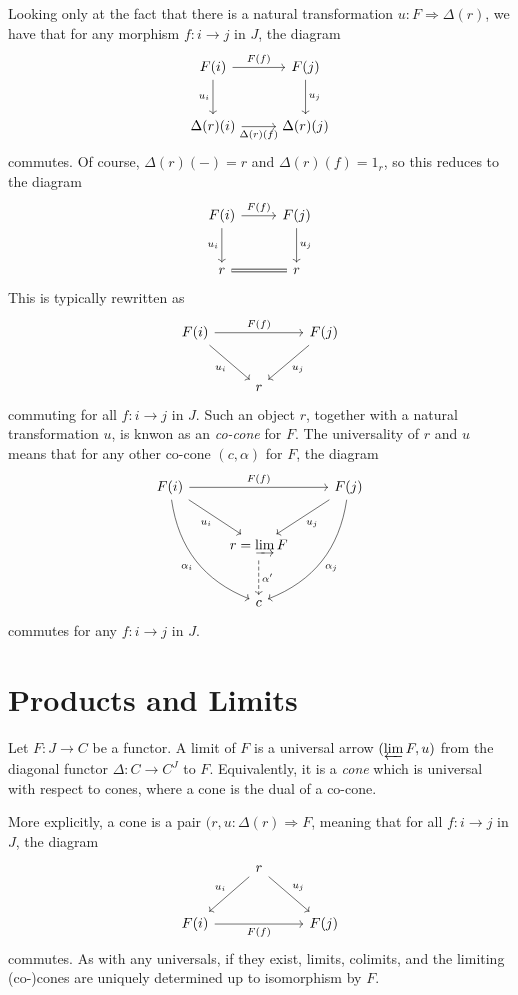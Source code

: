 Looking only at the fact that there is a natural transformation $u : F \Rightarrow \Delta (r)$, we have that for any morphism $f : i \to j$ in $J$, the diagram
\[\begin{tikzcd}[row sep = 2.5em, column sep = 2.5em]
F(i)\ar[" F(f) ", r] \ar[" u_i "', d]  & F(j)\ar[" u_j ", d]  \\
\Delta (r)(i)\ar[" \Delta (r)(f) "', r]  & \Delta (r)(j)
\end{tikzcd}\]
commutes. Of course, $\Delta (r)(-)=r$ and $\Delta (r)(f)=1_r$, so this reduces to the diagram
\[\begin{tikzcd}[row sep = 2.5em, column sep = 2.5em]
F(i)\ar[" F(f) ", r] \ar[" u_i "', d]  & F(j)\ar[" u_j ", d]  \\
r\ar[equals, r]  & r
\end{tikzcd}\]
This is typically rewritten as
\[\begin{tikzcd}[row sep = 2.5em, column sep = 2.5em]
F(i)\ar[" F(f) ", rr] \ar[" u_i "', dr]  &  & F(j)\ar[" u_j ", dl]  \\
 & r & 
\end{tikzcd}\]
commuting for all $f : i \to j$ in $J$. Such an object $r$, together with a natural transformation $u$, is knwon as an \emph{co-cone} for $F$. The universality of $r$ and $u$ means that for any other co-cone $(c,\alpha )$ for $F$, the diagram
\[\begin{tikzcd}[row sep = 2.5em, column sep = 2.5em]
F(i)\ar[" F(f) ", rr] \ar[" u_i "', dr] \ar[" \alpha _i "', bend right, ddr]  &  & F(j)\ar[" u_j ", dl] \ar[" \alpha _j ", bend left, ddl]  \\
 & r=\varinjlim F \ar[" \alpha ' ", dashed, d]  &  \\
 & c & 
\end{tikzcd}\]
commutes for any $f : i \to j$ in $J$.

\section{Products and Limits}

\begin{definition}[Limit]\label{dfn:3.5}
	Let $F : J \to C$ be a functor. A limit of $F$ is a universal arrow $(\varprojlim F,u)$ from the diagonal functor $\Delta : C \to C^J$ to $F$. Equivalently, it is a \emph{cone} which is universal with respect to cones, where a cone is the dual of a co-cone.
\end{definition}
More explicitly, a cone is a pair $(r,u : \Delta (r) \Rightarrow F$, meaning that for all $f : i \to j$ in $J$, the diagram
\[\begin{tikzcd}[row sep = 2.5em, column sep = 2.5em]
 & r\ar[" u_j ", dr] \ar[" u_i "', dl]  &  \\
F(i)\ar[" F(f) "', rr]  &  & F(j)
\end{tikzcd}\]
commutes. As with any universals, if they exist, limits, colimits, and the limiting (co-)cones are uniquely determined up to isomorphism by $F$.

